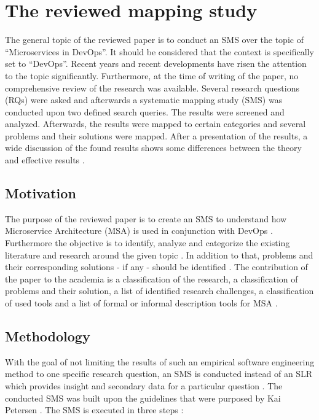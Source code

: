 \section{The reviewed mapping study}

The general topic of the reviewed paper is to conduct an SMS over the topic
of ``Microservices in DevOps''. It should be considered that the context
is specifically set to ``DevOps''. Recent years and recent developments
have risen the attention to the topic significantly. Furthermore, at the
time of writing of the paper, no comprehensive review of the research was
available. Several research questions (RQs) were
asked and afterwards a systematic mapping study (SMS) was conducted upon two
defined search queries. The results were screened and analyzed. Afterwards, the
results were mapped to certain categories and several problems and their solutions
were mapped. After a presentation of the results, a wide discussion of the found
results shows some differences between the theory and effective results \cite{waseem:SMSMSADevOps}.


\subsection{Motivation}

The purpose of the reviewed paper is to create an SMS to understand how 
Microservice Architecture (MSA) is used in conjunction with DevOps \cite{waseem:SMSMSADevOps}.
Furthermore the objective is to identify, analyze and categorize the
existing literature and research around the given topic \cite{waseem:SMSMSADevOps}.
In addition to that, problems and their corresponding solutions - if any - should
be identified \cite{waseem:SMSMSADevOps}. The contribution of the paper to the
academia is a classification of the research, a classification of problems
and their solution, a list of identified research challenges, a classification of
used tools and a list of formal or informal description tools for MSA \cite{waseem:SMSMSADevOps}.


\subsection{Methodology}

With the goal of not limiting the results of such 
an empirical software engineering method to one specific research question,
an SMS is conducted instead of an SLR which provides insight and secondary
data for a particular question \cite{waseem:SMSMSADevOps}. The conducted
SMS was built upon the guidelines that were purposed by Kai Petersen \cite{petersen:SMS}.
The SMS is executed in three steps \cite{waseem:SMSMSADevOps}:

